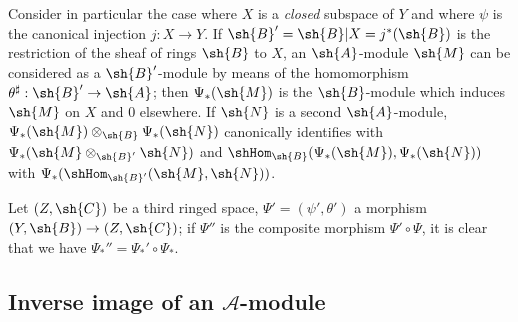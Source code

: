 \begin{env}[4.2.5]
\label{0.4.2.5}
Consider in particular the case where $X$ is a \emph{closed} subspace of $Y$ and
where $\psi$ is the canonical injection $j:X\to Y$. If
$\sh{B}'=\sh{B}|X=j^*(\sh{B})$ is the restriction of the sheaf of rings $\sh{B}$
to $X$, an $\sh{A}$-module $\sh{M}$ can be considered as a $\sh{B}'$-module by
means of the homomorphism $\theta^\sharp:\sh{B}'\to\sh{A}$; then
$\Psi_*(\sh{M})$ is the $\sh{B}$-module which induces $\sh{M}$ on $X$ and $0$
elsewhere. If $\sh{N}$ is a second $\sh{A}$-module,
$\Psi_*(\sh{M})\otimes_\sh{B}\Psi_*(\sh{N})$ canonically identifies with
$\Psi_*(\sh{M}\otimes_{\sh{B}'}\sh{N})$ and
$\shHom_\sh{B}(\Psi_*(\sh{M}),\Psi_*(\sh{N}))$ with
$\Psi_*(\shHom_{\sh{B}'}(\sh{M},\sh{N}))$.
\end{env}

\begin{env}[4.2.6]
\label{0.4.2.6}
Let $(Z,\sh{C})$ be a third ringed space, $\Psi'=(\psi',\theta')$ a morphism
$(Y,\sh{B})\to(Z,\sh{C})$; if $\Psi''$ is the composite morphism
$\Psi'\circ\Psi$, it is clear that we have $\Psi_*''=\Psi_*'\circ\Psi_*$.
\end{env}

\subsection{Inverse image of an $\mathcal{A}$-module}
\label{subsection:0.4.3}

